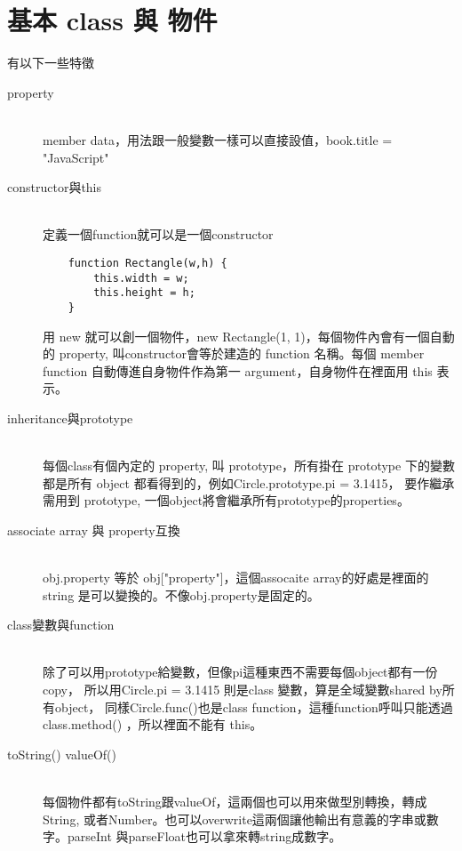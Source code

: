 \section{基本 class 與 物件}
有以下一些特徵
\begin{description}
  \item[property] \hfill \\
    member data，用法跟一般變數一樣可以直接設值，book.title = "JavaScript"
  \item[constructor與this] \hfill \\
    定義一個function就可以是一個constructor
    \begin{verbatim}
    function Rectangle(w,h) {
        this.width = w;
        this.height = h;
    }
    \end{verbatim}
    用 new 就可以創一個物件，new Rectangle(1, 1)，每個物件內會有一個自動的
    property, 叫constructor會等於建造的 function 名稱。每個 member function
    自動傳進自身物件作為第一 argument，自身物件在裡面用 this 表示。
  \item[inheritance與prototype] \hfill \\
    每個class有個內定的 property, 叫 prototype，所有掛在 prototype 下的變數
    都是所有 object 都看得到的，例如Circle.prototype.pi = 3.1415，
    要作繼承需用到 prototype, 一個object將會繼承所有prototype的properties。
  \item[associate array 與 property互換] \hfill \\
    obj.property 等於 obj["property"]，這個assocaite array的好處是裡面的string
    是可以變換的。不像obj.property是固定的。
  \item[class變數與function] \hfill \\
    除了可以用prototype給變數，但像pi這種東西不需要每個object都有一份copy，
    所以用Circle.pi = 3.1415 則是class 變數，算是全域變數shared by所有object，
    同樣Circle.func()也是class function，這種function呼叫只能透過class.method()
    ，所以裡面不能有 this。
  \item[toString() valueOf()] \hfill \\
    每個物件都有toString跟valueOf，這兩個也可以用來做型別轉換，轉成String,
    或者Number。也可以overwrite這兩個讓他輸出有意義的字串或數字。parseInt
    與parseFloat也可以拿來轉string成數字。
\end{description}

